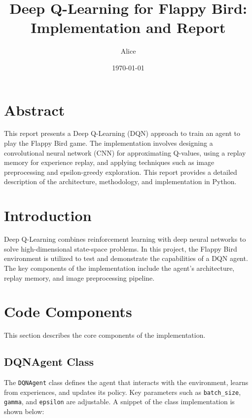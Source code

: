 \documentclass[a4paper,12pt]{article}
\title{Deep Q-Learning for Flappy Bird: Implementation and Report}
\author{Alice}
\date{\today}
\begin{document}
\maketitle

\section*{Abstract}
This report presents a Deep Q-Learning (DQN) approach to train an agent to play the Flappy Bird game. The implementation involves designing a convolutional neural network (CNN) for approximating Q-values, using a replay memory for experience replay, and applying techniques such as image preprocessing and epsilon-greedy exploration. This report provides a detailed description of the architecture, methodology, and implementation in Python.

\section{Introduction}
Deep Q-Learning combines reinforcement learning with deep neural networks to solve high-dimensional state-space problems. In this project, the Flappy Bird environment is utilized to test and demonstrate the capabilities of a DQN agent. The key components of the implementation include the agent's architecture, replay memory, and image preprocessing pipeline.

\section{Code Components}
This section describes the core components of the implementation.

\subsection{DQNAgent Class}
The \texttt{DQNAgent} class defines the agent that interacts with the environment, learns from experiences, and updates its policy. Key parameters such as \texttt{batch\_size}, \texttt{gamma}, and \texttt{epsilon} are adjustable. A snippet of the class implementation is shown below:
\end{document}
